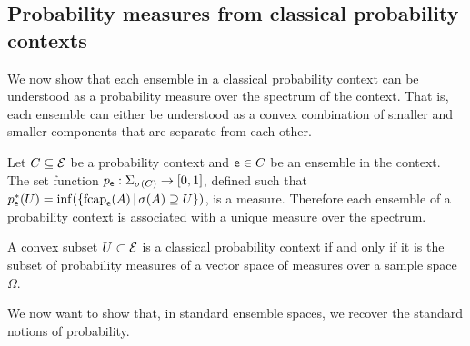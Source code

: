 \subsection{Probability measures from classical probability contexts}

We now show that each ensemble in a classical probability context can be understood as a probability measure over the spectrum of the context. That is, each ensemble can either be understood as a convex combination of smaller and smaller components that are separate from each other.

\begin{mathSection}
\begin{conj}
	Let $C \subseteq \mathcal{E}$ be a probability context and $\mathsf{e} \in C$ be an ensemble in the context. The set function $p_{\mathsf{e}} : \Sigma_{\sigma(C)} \to[0,1]$, defined such that $p^*_{\mathsf{e}}(U) = \inf(\{ \mathrm{fcap}_{\mathsf{e}}(A) \, | \, \sigma(A) \supseteq U \})$, is a measure. Therefore each ensemble of a probability context is associated with a unique measure over the spectrum.
\end{conj}
\end{mathSection}

\begin{conj}
	A convex subset $U \subset \mathcal{E}$ is a classical probability context if and only if it is the subset of probability measures of a vector space of measures over a sample space $\Omega$.
\end{conj}

We now want to show that, in standard ensemble spaces, we recover the standard notions of probability.

